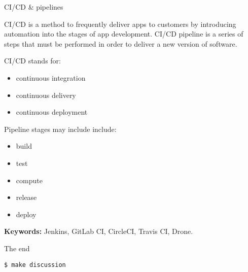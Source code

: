 \documentclass[
	9pt,
	hyperref = {unicode,pdfpagelabels=false},
	aspectratio = 43
	]{beamer}
\begin{document}
\begin{frame}{CI/CD \& pipelines}


	CI/CD is a method to frequently deliver apps to customers by introducing automation into the stages of app development. CI/CD pipeline is a series of steps that must be performed in order to deliver a new version of software.

	\vfill

	\begin{minipage}[t]{.5\linewidth}
		CI/CD stands for:
		\begin{itemize}
		 	\item continuous integration
		 	\item continuous delivery
		 	\item continuous deployment
		 \end{itemize}		
	\end{minipage}%
	\begin{minipage}[t]{.5\linewidth}
		Pipeline stages may include include:
		\begin{itemize}
			\item build
			\item test
			\item compute
			\item release
			\item deploy
		\end{itemize}
	\end{minipage}

	\vfill

	\textbf{Keywords:} Jenkins, GitLab CI, CircleCI, Travis CI, Drone.
\end{frame}

\begin{frame}{The end}
	\begin{center}
		\texttt{\$ make discussion}
	\end{center}
\end{frame}
\end{document}
